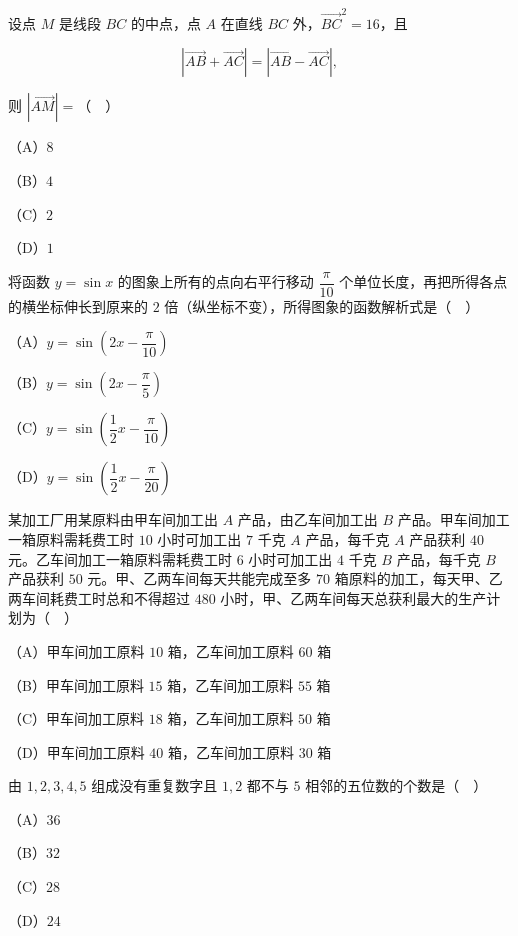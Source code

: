 \begin{question}
设点 $M$ 是线段 $BC$ 的中点，点 $A$ 在直线 $BC$ 外，$\overrightarrow{BC}^2=16$，且

\nopagebreak[4]
\[\left|\overrightarrow{AB}+\overrightarrow{AC}\right|=\left|\overrightarrow{AB}-\overrightarrow{AC}\right|,\]

则 $|\overrightarrow{AM}|=$（　）

（A）$8$

（B）$4$

（C）$2$

（D）$1$

\end{question}
\begin{question}
将函数 $y=\sin x$ 的图象上所有的点向右平行移动 $\dfrac\pi{10}$ 个单位长度，再把所得各点的横坐标伸长到原来的 $2$ 倍（纵坐标不变），所得图象的函数解析式是（　）

（A）$y=\sin\left(2x-\dfrac\pi{10}\right)$

（B）$y=\sin\left(2x-\dfrac\pi5\right)$

（C）$y=\sin\left(\dfrac12x-\dfrac\pi{10}\right)$

（D）$y=\sin\left(\dfrac12x-\dfrac\pi{20}\right)$

\end{question}
\begin{question}
某加工厂用某原料由甲车间加工出 $A$ 产品，由乙车间加工出 $B$ 产品。甲车间加工一箱原料需耗费工时 $10$ 小时可加工出 $7$ 千克 $A$ 产品，每千克 $A$ 产品获利 $40$ 元。乙车间加工一箱原料需耗费工时 $6$ 小时可加工出 $4$ 千克 $B$ 产品，每千克 $B$ 产品获利 $50$ 元。甲、乙两车间每天共能完成至多 $70$ 箱原料的加工，每天甲、乙两车间耗费工时总和不得超过 $480$ 小时，甲、乙两车间每天总获利最大的生产计划为（　）

（A）甲车间加工原料 $10$ 箱，乙车间加工原料 $60$ 箱

（B）甲车间加工原料 $15$ 箱，乙车间加工原料 $55$ 箱

（C）甲车间加工原料 $18$ 箱，乙车间加工原料 $50$ 箱

（D）甲车间加工原料 $40$ 箱，乙车间加工原料 $30$ 箱

\end{question}
\begingroup
\renewenvironment{question}{\Needspace{0.5\textheight}}{}
\begin{question}
由 $1,2,3,4,5$ 组成没有重复数字且 $1,2$ 都不与 $5$ 相邻的五位数的个数是（　）

（A）$36$

（B）$32$

（C）$28$

（D）$24$

\end{question}
